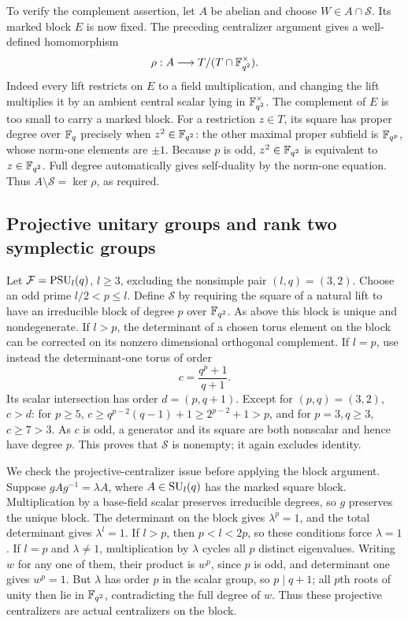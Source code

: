To verify the complement assertion, let $A$ be abelian and choose
$W\in A\cap\mathcal S$. Its marked block $E$ is now fixed.
The preceding centralizer argument gives a well-defined homomorphism
\begin{equation}\label{fg:classical-restriction}
 \rho:A\longrightarrow
 T/(T\cap\mathbb F_{q^2}^{\times}).
\end{equation}
Indeed every lift restricts on $E$ to a field multiplication, and
changing the lift multiplies it by an ambient central scalar lying in
$\mathbb F_{q^2}^{\times}$. The complement of $E$ is too small to carry a
marked block. For a restriction $z\in T$, its square has proper degree
over $\mathbb F_q$ precisely when $z^2\in\mathbb F_{q^2}$: the other maximal
proper subfield is $\mathbb F_{q^p}$, whose norm-one elements are $\pm1$.
Because $p$ is odd, $z^2\in\mathbb F_{q^2}$ is equivalent to
$z\in\mathbb F_{q^2}$. Full degree automatically gives self-duality by the
norm-one equation. Thus $A\setminus\mathcal S=\ker\rho$, as required.

\subsection{Projective unitary groups and rank two symplectic groups}

Let $\mathcal F=\operatorname{PSU}_l(q)$, $l\ge3$, excluding the nonsimple pair
$(l,q)=(3,2)$. Choose an odd prime $l/2<p\le l$. Define
$\mathcal S$ by requiring the square of a natural lift to have an
irreducible block of degree $p$ over $\mathbb F_{q^2}$. As above this
block is unique and nondegenerate. If $l>p$, the determinant of a
chosen torus element on the block can be corrected on its nonzero
dimensional orthogonal complement. If $l=p$, use instead the
determinant-one torus of order
\[
 c=\frac{q^p+1}{q+1}.
\]
Its scalar intersection has order $d=(p,q+1)$. Except for
$(p,q)=(3,2)$, $c>d$: for $p\ge5$,
$c\ge q^{p-2}(q-1)+1\ge2^{p-2}+1>p$, and for $p=3,q\ge3$,
$c\ge7>3$. As $c$ is odd, a generator and its square are both
nonscalar and hence have degree $p$. This proves that
$\mathcal S$ is nonempty; it again excludes identity.

We check the projective-centralizer issue before applying the block
argument. Suppose $gAg^{-1}=\lambda A$, where $A\in\operatorname{SU}_l(q)$ has
the marked square block. Multiplication by a base-field scalar
preserves irreducible degrees, so $g$ preserves the unique block.
The determinant on the block gives $\lambda^p=1$, and the total
determinant gives $\lambda^l=1$. If $l>p$, then $p<l<2p$, so these
conditions force $\lambda=1$. If $l=p$ and $\lambda\ne1$, multiplication
by $\lambda$ cycles all $p$ distinct eigenvalues. Writing $w$ for any one of them,
their product is $w^p$, since $p$ is odd, and determinant one gives
$w^p=1$.
But $\lambda$ has order $p$ in the scalar group, so $p\mid q+1$;
all $p$th roots of unity then lie in $\mathbb F_{q^2}$, contradicting
the full degree of $w$. Thus these projective centralizers are
actual centralizers on the block.

